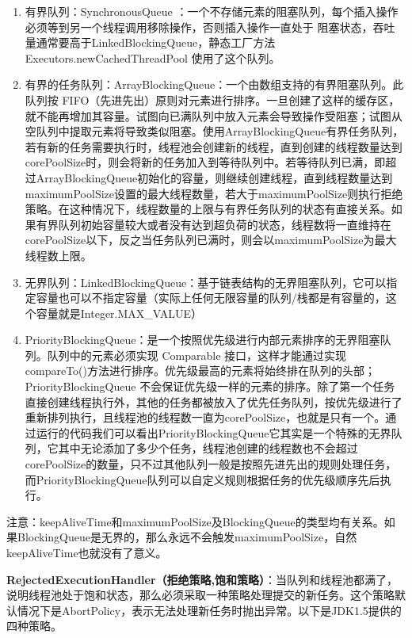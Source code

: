 \documentclass[../../../interview-questions.tex]{subfiles}
\begin{document}
\begin{enumerate}
    \item {有界队列：SynchronousQueue ：一个不存储元素的阻塞队列，每个插入操作必须等到另一个线程调用移除操作，否则插入操作一直处于 阻塞状态，吞吐量通常要高于LinkedBlockingQueue，静态工厂方法 Executors.newCachedThreadPool 使用了这个队列。}
    \item {有界的任务队列：ArrayBlockingQueue：一个由数组支持的有界阻塞队列。此队列按 FIFO（先进先出）原则对元素进行排序。一旦创建了这样的缓存区，就不能再增加其容量。试图向已满队列中放入元素会导致操作受阻塞；试图从空队列中提取元素将导致类似阻塞。}使用ArrayBlockingQueue有界任务队列，若有新的任务需要执行时，线程池会创建新的线程，直到创建的线程数量达到corePoolSize时，则会将新的任务加入到等待队列中。若等待队列已满，即超过ArrayBlockingQueue初始化的容量，则继续创建线程，直到线程数量达到maximumPoolSize设置的最大线程数量，若大于maximumPoolSize则执行拒绝策略。在这种情况下，线程数量的上限与有界任务队列的状态有直接关系。如果有界队列初始容量较大或者没有达到超负荷的状态，线程数将一直维持在corePoolSize以下，反之当任务队列已满时，则会以maximumPoolSize为最大线程数上限。
    \item {无界队列：LinkedBlockingQueue：基于链表结构的无界阻塞队列，它可以指定容量也可以不指定容量（实际上任何无限容量的队列/栈都是有容量的，这个容量就是Integer.MAX\_VALUE）}
    \item {PriorityBlockingQueue：是一个按照优先级进行内部元素排序的无界阻塞队列。队列中的元素必须实现 Comparable 接口，这样才能通过实现compareTo()方法进行排序。优先级最高的元素将始终排在队列的头部；PriorityBlockingQueue 不会保证优先级一样的元素的排序。}除了第一个任务直接创建线程执行外，其他的任务都被放入了优先任务队列，按优先级进行了重新排列执行，且线程池的线程数一直为corePoolSize，也就是只有一个。通过运行的代码我们可以看出PriorityBlockingQueue它其实是一个特殊的无界队列，它其中无论添加了多少个任务，线程池创建的线程数也不会超过corePoolSize的数量，只不过其他队列一般是按照先进先出的规则处理任务，而PriorityBlockingQueue队列可以自定义规则根据任务的优先级顺序先后执行。
\end{enumerate}

注意：keepAliveTime和maximumPoolSize及BlockingQueue的类型均有关系。如果BlockingQueue是无界的，那么永远不会触发maximumPoolSize，自然keepAliveTime也就没有了意义。


\textbf{RejectedExecutionHandler（拒绝策略,饱和策略）}：当队列和线程池都满了，说明线程池处于饱和状态，那么必须采取一种策略处理提交的新任务。这个策略默认情况下是AbortPolicy，表示无法处理新任务时抛出异常。以下是JDK1.5提供的四种策略。
\end{document}
